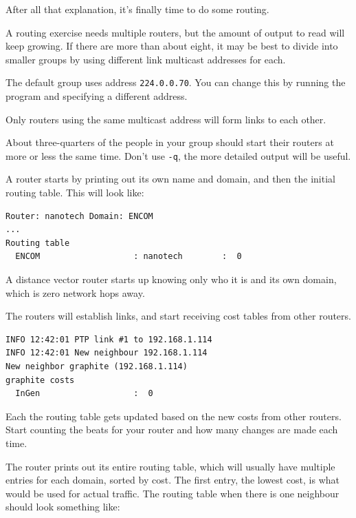 
After all that explanation, it's finally time to do some routing.

\STEP
A routing exercise needs multiple routers, but the amount of
output to read will keep growing. If there are more than about
eight, it may be best to divide into smaller groups by using
different link multicast addresses for each.

The default group uses address \texttt{224.0.0.70}. You can change
this by running the program and specifying a different address.


Only routers using the same multicast address will form links
to each other.


\STEP
About three-quarters of the people in your group should start their
routers at more or less the same time. Don't use \texttt{-q}, the
more detailed output will be useful.

A router starts by printing out its own name and domain, and then
the initial routing table. This will look like:

\begin{CODE}\begin{verbatim}
Router: nanotech Domain: ENCOM
...
Routing table
  ENCOM                   : nanotech        :  0
\end{verbatim}\end{CODE}

A distance vector router starts up knowing only who it
is and its own domain, which is zero network hops away.


\STEP
The routers will establish links, and start receiving cost
tables from other routers.

\begin{CODE}\begin{verbatim}
INFO 12:42:01 PTP link #1 to 192.168.1.114 
INFO 12:42:01 New neighbour 192.168.1.114 
New neighbor graphite (192.168.1.114)
graphite costs
  InGen                   :  0
\end{verbatim}\end{CODE}

Each  the routing table gets
updated based on the new costs from other routers. Start counting
the beats for your router and how many changes are made each time.

The router prints out its entire routing table, which will usually
have multiple entries for each domain, sorted by cost. The first
entry, the lowest cost, is what would be used for actual traffic.
The routing table when there is one neighbour should look something
like:

